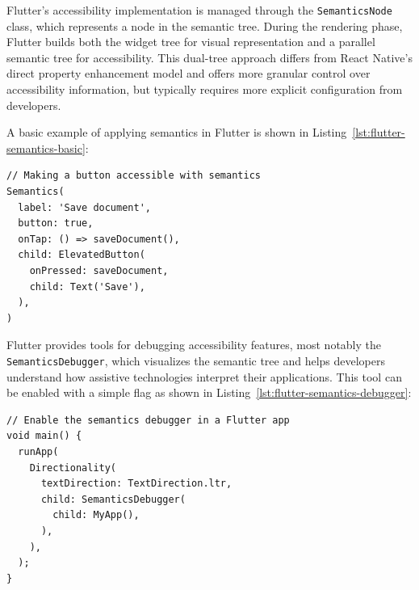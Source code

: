 Flutter's accessibility implementation is managed through the \texttt{SemanticsNode} class, which represents a node in the semantic tree. During the rendering phase, Flutter builds both the widget tree for visual representation and a parallel semantic tree for accessibility. This dual-tree approach differs from React Native's direct property enhancement model and offers more granular control over accessibility information, but typically requires more explicit configuration from developers.

A basic example of applying semantics in Flutter is shown in Listing~\ref{lst:flutter-semantics-basic}:

\begin{lstlisting}[style=DartStyle, caption=Basic Semantics implementation in Flutter, label=lst:flutter-semantics-basic]
// Making a button accessible with semantics
Semantics(
  label: 'Save document',
  button: true,
  onTap: () => saveDocument(),
  child: ElevatedButton(
    onPressed: saveDocument,
    child: Text('Save'),
  ),
)
\end{lstlisting}

\FloatBarrier

Flutter provides tools for debugging accessibility features, most notably the \\\texttt{SemanticsDebugger}, which visualizes the semantic tree and helps developers understand how assistive technologies interpret their applications. This tool can be enabled with a simple flag as shown in Listing~\ref{lst:flutter-semantics-debugger}:

\begin{lstlisting}[style=DartStyle, caption=Using the SemanticsDebugger in Flutter, label=lst:flutter-semantics-debugger]
// Enable the semantics debugger in a Flutter app
void main() {
  runApp(
    Directionality(
      textDirection: TextDirection.ltr,
      child: SemanticsDebugger(
        child: MyApp(),
      ),
    ),
  );
}
\end{lstlisting}

\FloatBarrier

